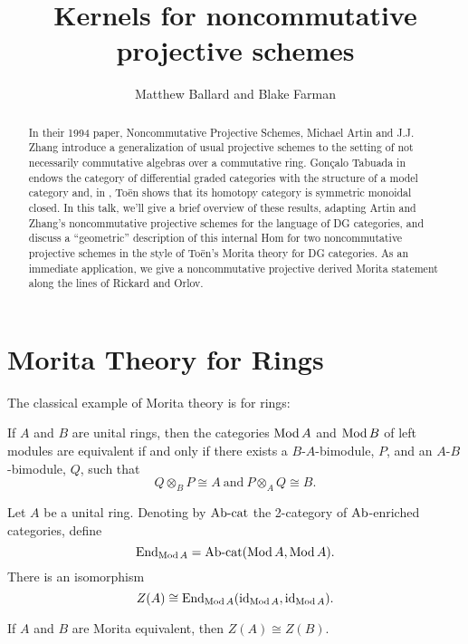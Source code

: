 \documentclass[reqno, 12pt]{amsart}
\title[Noncommutative kernels]{Kernels for noncommutative projective schemes}
\author{Matthew Ballard and Blake Farman}
\begin{document}
\begin{abstract}
  In their 1994 paper, Noncommutative Projective Schemes, Michael Artin and J.J. Zhang introduce a generalization of usual projective schemes to the setting of not necessarily commutative algebras over a commutative ring. Gon\c{c}alo Tabuada in \cite{Tab05} endows the category of differential graded categories with the structure of a model category and, in \cite{Toen}, To\"en shows that its homotopy category is symmetric monoidal closed. In this talk, we’ll give a brief overview of these results, adapting Artin and Zhang’s noncommutative projective schemes for the language of DG categories, and discuss a “geometric” description of this internal Hom for two noncommutative projective schemes in the style of To\"{e}n's Morita theory for DG categories.
  As an immediate application, we give a noncommutative projective derived Morita statement along the lines of Rickard and Orlov.
\end{abstract}

\maketitle

\section{Morita Theory  for Rings} \label{section: Morita for Rings}
The classical example of Morita theory is for rings:

\begin{theorem}\label{thm: Morita}
  If $A$ and $B$ are unital rings, then the categories $\operatorname{Mod}A$ and $\operatorname{Mod}B$ of left modules are equivalent if and only if there exists a $B$-$A$-bimodule, $P$, and an $A$-$B$-bimodule, $Q$, such that
  $$Q \otimes_B P \cong A\ \text{and}\ P \otimes_A Q \cong B.$$
\end{theorem}

\begin{lemma}\label{lem: endomorphisms of identity functor are the center}
  Let $A$ be a unital ring.
  Denoting by $\operatorname{Ab-cat}$ the 2-category of \newline$\operatorname{Ab}$-enriched categories, define 
  $$\operatorname{End}_{\operatorname{Mod}A} = \operatorname{Ab-cat}(\operatorname{Mod}A,\operatorname{Mod}A).$$
There is an isomorphism
$$Z(A) \cong \operatorname{End}_{\operatorname{Mod}A}(\operatorname{id}_{\operatorname{Mod}A}, \operatorname{id}_{\operatorname{Mod}A}).$$
\end{lemma}

\begin{corollary}\label{cor: morita implies isomorphic centers}
  If $A$ and $B$ are Morita equivalent, then $Z(A) \cong Z(B)$.
\end{corollary}
\end{document}
